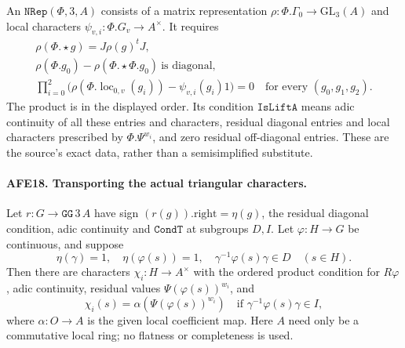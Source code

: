 An \(\texttt{NRep}(\Phi,3,A)\) consists of a matrix
representation \(\rho:\Phi.\Gamma_0\to\mathrm{GL}_3(A)\)
and local characters \(\psi_{v,i}:\Phi.G_v\to A^\times\).
It requires
\[
 \begin{gathered}
 \rho(\Phi.\star g)=J\rho(g)^tJ,\\
 \rho(\Phi.g_0)-\rho(\Phi.\star\Phi.g_0)
                         \ \text{is diagonal},\\
 \prod_{i=0}^{2}
   \bigl(\rho(\Phi.\operatorname{loc}_{0,v}(g_i))
                         -\psi_{v,i}(g_i)1\bigr)=0
                       \quad\text{for every }(g_0,g_1,g_2).
 \end{gathered}                                         \tag{AFE.27}
\]
The product is in the displayed order.
Its condition \(\texttt{IsLiftA}\) means adic continuity
of all these entries and characters, residual diagonal
entries and local characters prescribed by
\(\Phi.\Psi^{w_i}\), and zero residual off-diagonal
entries.  These are the source's exact data, rather
than a semisimplified substitute.

\paragraph{AFE18. Transporting the actual triangular characters.}
\label{claim:AFE18}
Let \(r:G\to\texttt{GG}\,3\,A\) have sign
\((r(g)).\mathrm{right}=\eta(g)\), the residual
diagonal condition, adic continuity and
\(\texttt{CondT}\) at subgroups \(D,I\).
Let \(\varphi:H\to G\) be continuous, and suppose
\[
 \eta(\gamma)=1,\quad \eta(\varphi(s))=1,\quad
                         \gamma^{-1}\varphi(s)\gamma\in D
                           \quad(s\in H).
 \]
Then there are characters \(\chi_i:H\to A^\times\)
with the ordered product condition for \(R\varphi\),
adic continuity, residual values
\(\Psi(\varphi(s))^{w_i}\), and
\[
 \chi_i(s)=\alpha(\Psi(\varphi(s))^{w_i})
 \quad\text{if }\gamma^{-1}\varphi(s)\gamma\in I,
                                                        \tag{AFE.28}
\]
where \(\alpha:O\to A\) is the given local coefficient map.
Here \(A\) need only be a commutative local ring;
no flatness or completeness is used.

